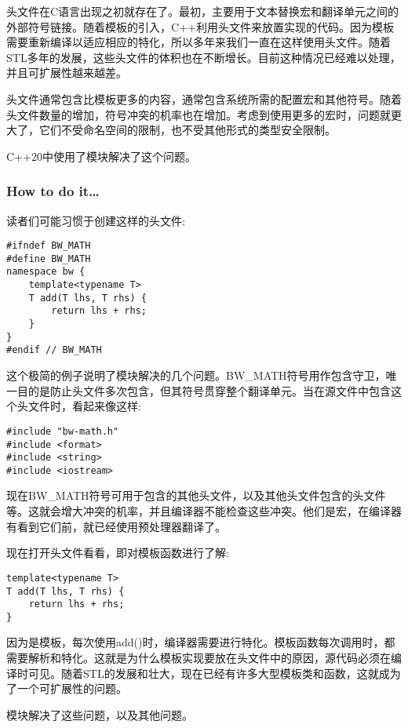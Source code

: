 
头文件在C语言出现之初就存在了。最初，主要用于文本替换宏和翻译单元之间的外部符号链接。随着模板的引入，C++利用头文件来放置实现的代码。因为模板需要重新编译以适应相应的特化，所以多年来我们一直在这样使用头文件。随着STL多年的发展，这些头文件的体积也在不断增长。目前这种情况已经难以处理，并且可扩展性越来越差。

头文件通常包含比模板更多的内容，通常包含系统所需的配置宏和其他符号。随着头文件数量的增加，符号冲突的机率也在增加。考虑到使用更多的宏时，问题就更大了，它们不受命名空间的限制，也不受其他形式的类型安全限制。

C++20中使用了模块解决了这个问题。

\subsubsection{How to do it…}

读者们可能习惯于创建这样的头文件:

\begin{lstlisting}[style=styleCXX]
#ifndef BW_MATH
#define BW_MATH
namespace bw {
	template<typename T>
	T add(T lhs, T rhs) {
		return lhs + rhs;
	}
}
#endif // BW_MATH
\end{lstlisting}

这个极简的例子说明了模块解决的几个问题。BW\_MATH符号用作包含守卫，唯一目的是防止头文件多次包含，但其符号贯穿整个翻译单元。当在源文件中包含这个头文件时，看起来像这样:

\begin{lstlisting}[style=styleCXX]
#include "bw-math.h"
#include <format>
#include <string>
#include <iostream>
\end{lstlisting}

现在BW\_MATH符号可用于包含的其他头文件，以及其他头文件包含的头文件等。这就会增大冲突的机率，并且编译器不能检查这些冲突。他们是宏，在编译器有看到它们前，就已经使用预处理器翻译了。

现在打开头文件看看，即对模板函数进行了解:

\begin{lstlisting}[style=styleCXX]
template<typename T>
T add(T lhs, T rhs) {
	return lhs + rhs;
}
\end{lstlisting}

因为是模板，每次使用add()时，编译器需要进行特化。模板函数每次调用时，都需要解析和特化。这就是为什么模板实现要放在头文件中的原因，源代码必须在编译时可见。随着STL的发展和壮大，现在已经有许多大型模板类和函数，这就成为了一个可扩展性的问题。

模块解决了这些问题，以及其他问题。


